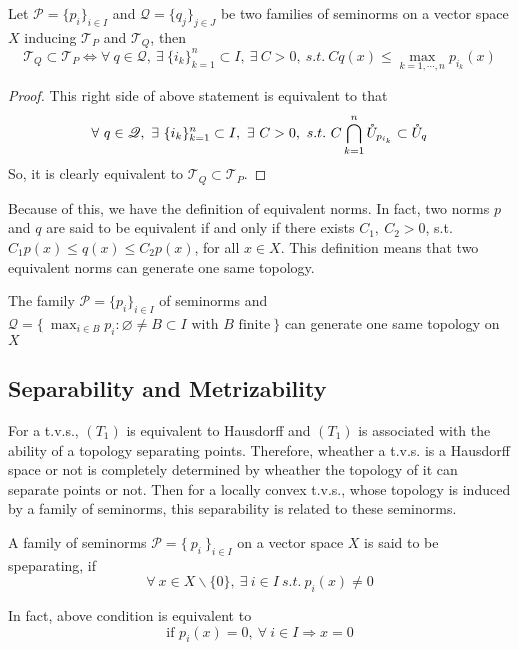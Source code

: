 \documentclass[a4paper,11pt]{report}
\begin{document}
\begin{thm}
	Let $\mathscr{P} = \{p_i\}_{i \in I}$ and $\mathscr{Q} = \{q_j\}_{j \in J}$ be two families of seminorms on a vector space $X$ inducing $\mathscr{T}_P$ and $\mathscr{T}_Q$, then
	\begin{equation*}
		\mathscr{T}_Q \subset \mathscr{T}_P \Leftrightarrow \forall~ q \in \mathscr{Q},~ \exists~ \{i_k\}_{k=1}^{n} \subset I,~ \exists~ C>0,~s.t.~ Cq(x) \leqslant \max_{k=1,\cdots,n}{p_{i_k}(x)}
	\end{equation*}
\end{thm}
\begin{proof}
	This right side of above statement is equivalent to that
	\begin{equation*}
		\forall~ q \in \mathscr{Q},~ \exists~ \{i_k\}_{k=1}^{n} \subset I,~ \exists~ C>0,~s.t.~ C \bigcap_{k=1}^{n} \mathring{U}_{p_{i_k}} \subset \mathring{U}_q
	\end{equation*}
	So, it is clearly equivalent to $\mathscr{T}_Q \subset \mathscr{T}_P$.
\end{proof}
\begin{rem}
	Because of this, we have the definition of equivalent norms. In fact, two norms $p$ and $q$ are said to be equivalent if and only if there exists $C_1,~ C_2 > 0$, s.t. $C_1p(x) \leqslant q(x) \leqslant C_2 p(x)$, for all $x \in X$. This definition means that two equivalent norms can generate one same topology. 
\end{rem}
\begin{cor} \label{cor1}
	The family $\mathscr{P} = \{p_i\}_{i \in I}$ of seminorms and \\$\mathscr{Q} = \{~ \max_{i \in B} p_i \colon \varnothing \neq B \subset I \text{ with } B \text{ finite} ~\}$ can generate one same topology on $X$
\end{cor}

\subsection{Separability and Metrizability}

For a t.v.s., $(T_1)$ is equivalent to Hausdorff and $(T_1)$ is associated with the ability of a topology separating points. Therefore, wheather a t.v.s. is a Hausdorff space or not is completely determined by wheather the topology of it can separate points or not. Then for a locally convex t.v.s., whose topology is induced by a family of seminorms, this separability is related to these seminorms.

\begin{defn}
	A family of seminorms $\mathscr{P} = \{~p_i~\}_{i \in I}$ on a vector space $X$ is said to be speparating, if
	\begin{equation*}
		\forall~ x \in X \backslash \{0\},~ \exists~ i \in I ~s.t.~ p_i(x) \neq 0
	\end{equation*}
\end{defn}
\begin{rem}
	In fact, above condition is equivalent to 
	\begin{equation*}
		\text{if } p_i(x) = 0, ~\forall~ i \in I \Rightarrow x = 0
	\end{equation*}
\end{rem}	
\end{document}
